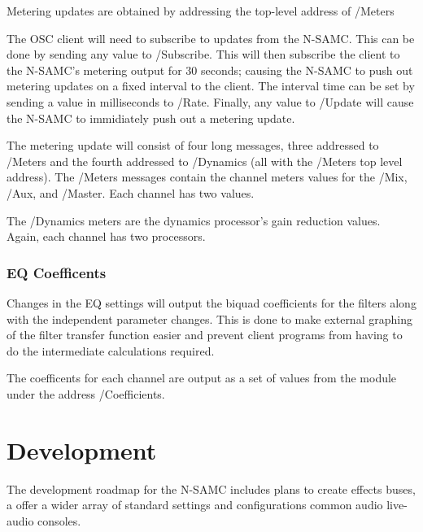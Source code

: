 \documentclass[letterpaper, 12pt, twosided, twocolumn]{article}
\begin{document}
Metering updates are obtained by addressing the top-level address of /Meters

The OSC client will need to subscribe to updates from the N-SAMC. This can be done by sending any value to /Subscribe. This will then subscribe the client to the N-SAMC's metering output for 30 seconds; causing the N-SAMC to push out metering updates on a fixed interval to the client. The interval time can be set by sending a value in milliseconds to /Rate. Finally, any value to /Update will cause the N-SAMC to immidiately push out a metering update.

The metering update will consist of four long messages, three addressed to /Meters and the fourth addressed to /Dynamics (all with the /Meters top level address). The /Meters messages contain the channel meters values for the /Mix, /Aux, and /Master. Each channel has two values.

The /Dynamics meters are the dynamics processor's gain reduction values. Again, each channel has two processors. 

\subsubsection{EQ Coefficents}

Changes in the EQ settings will output the biquad coefficients for the filters along with the independent parameter changes. This is done to make external graphing of the filter transfer function easier and prevent client programs from having to do the intermediate calculations required.

The coefficents for each channel are output as a set of values from the module under the address /Coefficients.

\section{Development}

The development roadmap for the N-SAMC includes plans to create effects buses, a offer a wider array of standard settings and configurations common audio live-audio consoles.
\end{document}
